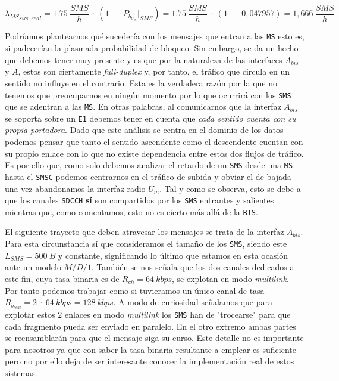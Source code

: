 \documentclass[10pt]{article}
\begin{document}
			$$\lambda_{MS_{SMS}}\biggr\rvert_{real} = 1.75\ \frac{SMS}{h}\ \cdot\ (1\ -\ P_{b_{U_m}}\bigr\rvert_{SMS}) = 1.75\ \frac{SMS}{h}\ \cdot\ (1\ -\ 0,047957) = 1,666\ \frac{SMS}{h}$$

			Podríamos plantearnos qué sucedería con los mensajes que entran a las \texttt{MS} esto es, si padecerían la plasmada probabilidad de bloqueo. Sin embargo, se da un hecho que debemos tener muy presente y es que por la naturaleza de las interfaces $A_{bis}$ y $A$, estos son ciertamente \textit{full-duplex} y, por tanto, el tráfico que circula en un sentido no influye en el contrario. Esta es la verdadera razón por la que no tenemos que preocuparnos en ningún momento por lo que ocurrirá con los \texttt{SMS} que se adentran a las \texttt{MS}. En otras palabras, al comunicarnos que la interfaz $A_{bis}$ se soporta sobre un \texttt{E1} debemos tener en cuenta que \textit{cada sentido cuenta con su propia portadora}. Dado que este análisis se centra en el dominio de los datos podemos pensar que tanto el sentido ascendente como el descendente cuentan con su propio enlace con lo que no existe dependencia entre estos dos flujos de tráfico. Es por ello que, como solo debemos analizar el retardo de un \texttt{SMS} desde una \texttt{MS} hasta el \texttt{SMSC} podemos centrarnos en el tráfico de subida y obviar el de bajada una vez abandonamos la interfaz radio $U_m$. Tal y como se observa, esto se debe a que los canales \texttt{SDCCH} \textbf{sí} son compartidos por los \texttt{SMS} entrantes y salientes mientras que, como comentamos, esto no es cierto más allá de la \texttt{BTS}.

			El siguiente trayecto que deben atravesar los mensajes se trata de la interfaz $A_{bis}$. Para esta circunstancia sí que consideramos el tamaño de los \texttt{SMS}, siendo este $L_{SMS} = 500\ B$ y constante, significando lo último que estamos en esta ocasión ante un modelo $M/D/1$. También se nos señala que los dos canales dedicados a este fin, cuya tasa binaria es de $R_{ch} = 64\ kbps$, se explotan en modo \textit{multilink}. Por tanto podemos trabajar como si tuvieramos un único canal de tasa $R_{b_{real}} = 2\ \cdot\ 64\ kbps = 128\ kbps$. A modo de curiosidad señalamos que para explotar estos $2$ enlaces en modo \textit{multilink} los \texttt{SMS} han de "trocearse" para que cada fragmento pueda ser enviado en paralelo. En el otro extremo ambas partes se reensamblarán para que el mensaje siga su curso. Este detalle no es importante para nosotros ya que con saber la tasa binaria resultante a emplear es suficiente pero no por ello deja de ser interesante conocer la implementación real de estos sistemas.
\end{document}

